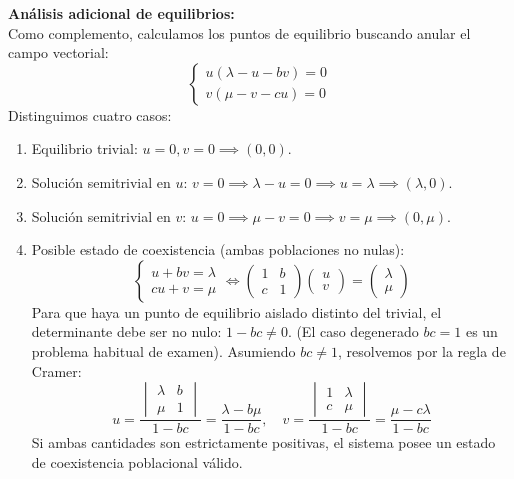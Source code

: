 {    \vspace{0.5cm}
    \textbf{Análisis adicional de equilibrios:} \\
    Como complemento, calculamos los puntos de equilibrio buscando anular el campo vectorial:
    \[
        \begin{cases}
            u(\lambda - u - bv) = 0 \\
            v(\mu - v - cu) = 0
        \end{cases}
    \]
    Distinguimos cuatro casos:
    \begin{enumerate}[label=\Roman*)]
        \item Equilibrio trivial: $u=0, v=0 \implies (0,0)$.
        \item Solución semitrivial en $u$: $v=0 \implies \lambda - u = 0 \implies u=\lambda \implies (\lambda, 0)$. 
        \item Solución semitrivial en $v$: $u=0 \implies \mu - v = 0 \implies v=\mu \implies (0, \mu)$.
        \item Posible estado de coexistencia (ambas poblaciones no nulas): 
        \[
            \begin{cases}
                u + bv = \lambda \\
                cu + v = \mu
            \end{cases}
            \iff
            \begin{pmatrix} 1 & b \\ c & 1 \end{pmatrix} \begin{pmatrix} u \\ v \end{pmatrix} = \begin{pmatrix} \lambda \\ \mu \end{pmatrix}
        \]
        Para que haya un punto de equilibrio aislado distinto del trivial, el determinante debe ser no nulo: $1 - bc \neq 0$. (El caso degenerado $bc=1$ es un problema habitual de examen). Asumiendo $bc \neq 1$, resolvemos por la regla de Cramer:
        \[
            u = \frac{\begin{vmatrix} \lambda & b \\ \mu & 1 \end{vmatrix}}{1 - bc} = \frac{\lambda - b\mu}{1 - bc}, \quad
            v = \frac{\begin{vmatrix} 1 & \lambda \\ c & \mu \end{vmatrix}}{1 - bc} = \frac{\mu - c\lambda}{1 - bc}
        \]
        Si ambas cantidades son estrictamente positivas, el sistema posee un estado de coexistencia poblacional válido.
    \end{enumerate}
    
}
